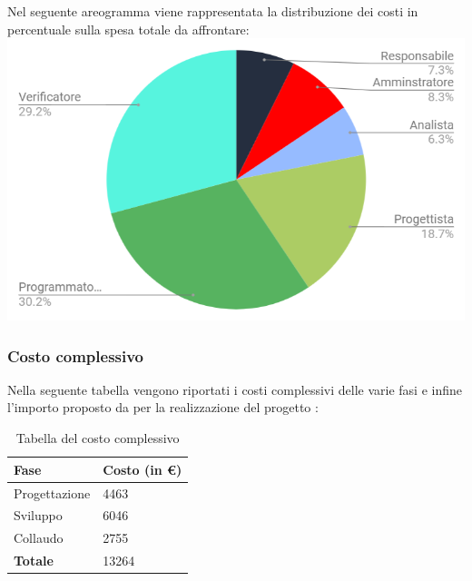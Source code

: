 Nel seguente areogramma viene rappresentata la distribuzione dei costi in percentuale sulla spesa totale da affrontare:\\
\includegraphics[width=1\textwidth]{./src/Preventivo/src/img/TortaPrevCompleto.png}

\subsubsection{Costo complessivo}
Nella seguente tabella vengono riportati i costi complessivi delle varie fasi e infine l'importo proposto da \Gruppo{} per la realizzazione del progetto \NomeProgetto{}:\\
{
\renewcommand{\arraystretch}{2}
\begin{longtable}{ C{5cm} C{5cm}}
\caption{Tabella del costo complessivo}\\
\rowcolor{\primaryColor}

\textcolor{\secondaryColor}{\textbf{Fase}} &
\textcolor{\secondaryColor}{\textbf{Costo  (in \euro{})}}\\	
\endhead

Progettazione  &  4463 \\
Sviluppo & 6046  \\
Collaudo &  2755 \\
\textbf{Totale}  &  13264 \\

\end{longtable}
}